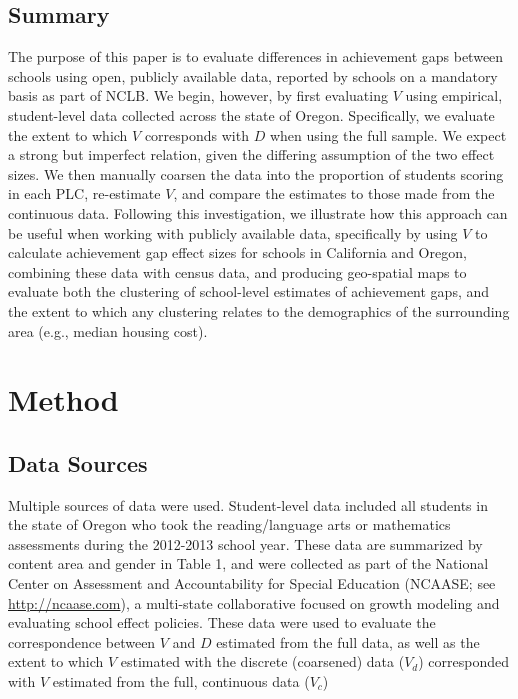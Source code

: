 \documentclass[man, fleqn, noextraspace]{apa6}
\theoremstyle{definition}
\theoremstyle{definition}
\theoremstyle{definition}
\theoremstyle{remark}
\begin{document}
\hypertarget{summary}{%
\subsection{Summary}\label{summary}}

The purpose of this paper is to evaluate differences in achievement gaps
between schools using open, publicly available data, reported by schools
on a mandatory basis as part of NCLB. We begin, however, by first
evaluating \(V\) using empirical, student-level data collected across
the state of Oregon. Specifically, we evaluate the extent to which \(V\)
corresponds with \(D\) when using the full sample. We expect a strong
but imperfect relation, given the differing assumption of the two effect
sizes. We then manually coarsen the data into the proportion of students
scoring in each PLC, re-estimate \(V\), and compare the estimates to
those made from the continuous data. Following this investigation, we
illustrate how this approach can be useful when working with publicly
available data, specifically by using \(V\) to calculate achievement gap
effect sizes for schools in California and Oregon, combining these data
with census data, and producing geo-spatial maps to evaluate both the
clustering of school-level estimates of achievement gaps, and the extent
to which any clustering relates to the demographics of the surrounding
area (e.g., median housing cost).

\hypertarget{method}{%
\section{Method}\label{method}}

\hypertarget{data-sources}{%
\subsection{Data Sources}\label{data-sources}}

Multiple sources of data were used. Student-level data included all
students in the state of Oregon who took the reading/language arts or
mathematics assessments during the 2012-2013 school year. These data are
summarized by content area and gender in Table 1, and were collected as
part of the National Center on Assessment and Accountability for Special
Education (NCAASE; see \url{http://ncaase.com}), a multi-state
collaborative focused on growth modeling and evaluating school effect
policies. These data were used to evaluate the correspondence between
\(V\) and \(D\) estimated from the full data, as well as the extent to
which \(V\) estimated with the discrete (coarsened) data (\(V_{d}\))
corresponded with \(V\) estimated from the full, continuous data
(\(V_{c}\))
\end{document}
